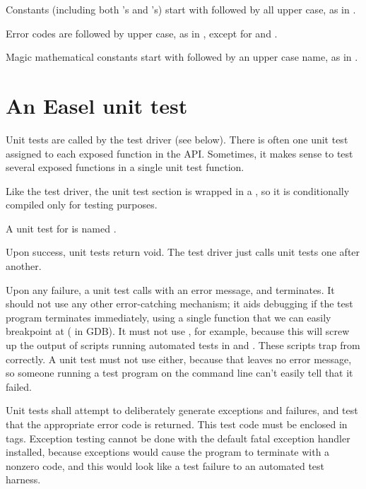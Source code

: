 Constants (including both 's and 's) start
with  followed by all upper case, as in
.

Error codes are  followed by upper case, as in
, except for  and .

Magic mathematical constants start with  followed by
an upper case name, as in .




\section{An Easel unit test}

Unit tests are called by the test driver (see below). There is often
one unit test assigned to each exposed function in the API. Sometimes,
it makes sense to test several exposed functions in a single unit test
function. 

Like the test driver, the unit test section is wrapped in a
, so it is conditionally compiled only
for testing purposes.

A unit test for  is named . 

Upon success, unit tests return void. The test driver just calls 
unit tests one after another.

Upon any failure, a unit test calls  with an error
message, and terminates. It should not use any other error-catching
mechanism; it aids debugging if the test program terminates
immediately, using a single function that we can easily breakpoint at
( in GDB). It must not use ,
for example, because this will screw up the output of scripts running
automated tests in  and . These
scripts trap  from  correctly.  A
unit test must not use  either, because that leaves no
error message, so someone running a test program on the command line
can't easily tell that it failed.

Unit tests shall attempt to deliberately generate exceptions and
failures, and test that the appropriate error code is returned.  This
test code must be enclosed in  tags.
Exception testing cannot be done with the default fatal exception
handler installed, because exceptions would cause the program to
terminate with a nonzero code, and this would look like a test failure
to an automated test harness.

